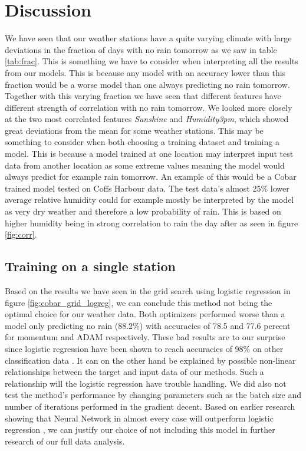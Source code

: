 \documentclass[11pt]{article}
\begin{document}
\section{Discussion}
\label{sec:Discussion}
We have seen that our weather stations have a quite varying climate with large deviations in the fraction of days with no rain tomorrow as we saw in table \ref{tab:frac}. This is something we have to consider when interpreting all the results from our models. This is because any model with an accuracy lower than this fraction would be a worse model than one always predicting no rain tomorrow. Together with this varying fraction we have seen that different features have different strength of correlation with no rain tomorrow. We looked more closely at the two most correlated features \textit{Sunshine} and \textit{Humidity3pm}, which showed great deviations from the mean for some weather stations. This may be something to consider when both choosing a training dataset and training a model. This is because a model trained at one location may interpret input test data from another location as some extreme values meaning the model would always predict for example rain tomorrow. An example of this would be a Cobar trained model tested on Coffs Harbour data. The test data's almost 25\% lower average relative humidity could for example mostly be interpreted by the model as very dry weather and therefore a low probability of rain. This is based on higher humidity being in strong correlation to rain the day after as seen in figure \ref{fig:corr}.

\subsection{Training on a single station} %
\label{sub:Training on a single station}
Based on the results we have seen in the grid search using logistic regression in figure \ref{fig:cobar_grid_logreg}, we can conclude this method not being the optimal choice for our weather data. Both optimizers performed worse than a model only predicting no rain (88.2\%) with accuracies of 78.5 and 77.6 percent for momentum and ADAM respectively. These bad results are to our surprise since logistic regression have been shown to reach accuracies of 98\% on other classification data \cite{project2}. It can on the other hand be explained by possible non-linear relationships between the target and input data of our methods. Such a relationship will the logistic regression have trouble handling. We did also not test the method's performance by changing parameters such as the batch size and number of iterations performed in the gradient decent. Based on earlier research showing that Neural Network in almost every case will outperform logistic regression \cite{logreg}, we can justify our choice of not including this model in further research of our full data analysis.
\end{document}
